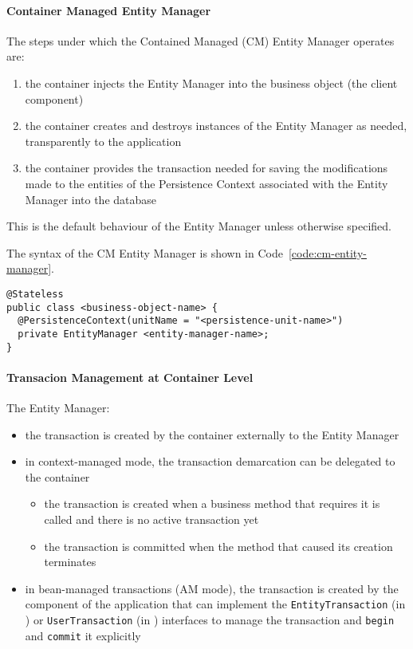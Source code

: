 \documentclass[english]{article}
\begin{document}
\paragraph{Container Managed Entity Manager}

The steps under which the Contained Managed (CM) Entity Manager operates are:
\begin{enumerate}
  \item the container injects the Entity Manager into the business object (the client component)
  \item the container creates and destroys instances of the Entity Manager as needed, transparently to the application
  \item the container provides the transaction needed for saving the modifications made to the entities of the Persistence Context associated with the Entity Manager into the database
\end{enumerate}

This is the default behaviour of the Entity Manager unless otherwise specified.

The syntax of the CM Entity Manager is shown in Code~\ref{code:cm-entity-manager}.

\begin{lstlisting}[language=annotatedjava, caption={CM Entity Manager}, label=code:cm-entity-manager]
@Stateless
public class <business-object-name> {
  @PersistenceContext(unitName = "<persistence-unit-name>")
  private EntityManager <entity-manager-name>;
}
\end{lstlisting}

\paragraph{Transacion Management at Container Level}

The \jpa Entity Manager:

\begin{itemize}
  \item the transaction is created by the container externally to the Entity Manager
  \item in context-managed mode, the transaction demarcation can be delegated to the container
        \begin{itemize}
          \item the transaction is created when a business method that requires it is called and there is no active transaction yet
          \item the transaction is committed when the method that caused its creation terminates
        \end{itemize}
  \item in bean-managed transactions (AM mode), the transaction is created by the component of the application that can implement the \texttt{EntityTransaction} (in \jpa) or \texttt{UserTransaction} (in \jta) interfaces to manage the transaction and \texttt{begin} and \texttt{commit} it explicitly
\end{itemize}
\end{document}
